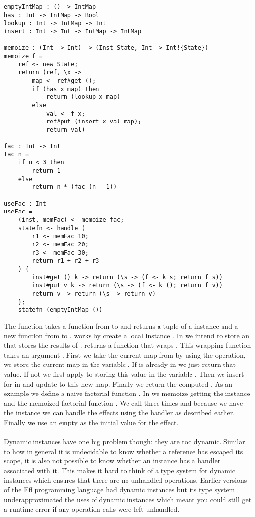 \begin{verbatim}
emptyIntMap : () -> IntMap
has : Int -> IntMap -> Bool
lookup : Int -> IntMap -> Int
insert : Int -> Int -> IntMap -> IntMap

memoize : (Int -> Int) -> (Inst State, Int -> Int!{State})
memoize f =
	ref <- new State;
	return (ref, \x ->
		map <- ref#get ();
		if (has x map) then
			return (lookup x map)
		else
			val <- f x;
			ref#put (insert x val map);
			return val)

fac : Int -> Int
fac n =
	if n < 3 then
		return 1
	else
		return n * (fac (n - 1))

useFac : Int
useFac =
	(inst, memFac) <- memoize fac;
	statefn <- handle (
		r1 <- memFac 10;
		r2 <- memFac 20;
		r3 <- memFac 30;
		return r1 + r2 + r3
	) {
		inst#get () k -> return (\s -> (f <- k s; return f s))
		inst#put v k -> return (\s -> (f <- k (); return f v))
		return v -> return (\s -> return v)
	};
	statefn (emptyIntMap ())
\end{verbatim}

The  function takes a function  from  to  and returns a tuple of a  instance and a new function from  to .  works by create a local  instance . In  we intend to store an  that stores the results of .  returns a function that wraps . This wrapping function takes an argument . First we take the current map from  by using the  operation, we store the current map in the variable . If  is already in  we just return that value. If not we first apply  to  storing this value in the variable . Then we insert  for  in  and update  to this new map. Finally we return the computed . As an example we define a naive factorial function . In  we memoize  getting the  instance  and the memoized factorial function . We call  three times and because we have the instance  we can handle the effects using the  handler as described earlier. Finally we use an empty  as the initial value for the  effect.
\\\\
Dynamic instances have one big problem though: they are too dynamic. Similar to how in general it is undecidable to know whether a reference has escaped its scope, it is also not possible to know whether an instance has a handler associated with it. This makes it hard to think of a type system for dynamic instances which ensures that there are no unhandled operations. Earlier versions of the Eff programming language\cite{eff1} had dynamic instances but its type system underapproximated the uses of dynamic instances which meant you could still get a runtime error if any operation calls were left unhandled.
